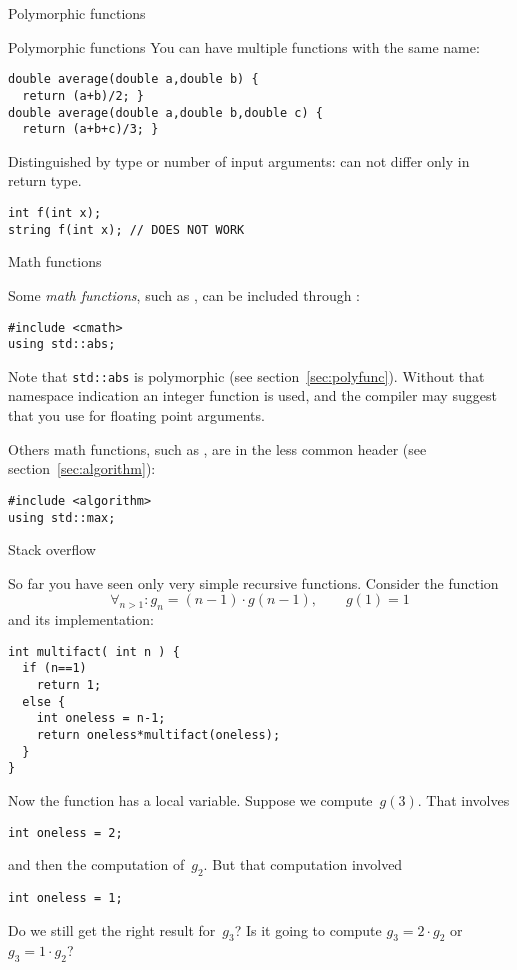  {Polymorphic functions}
\label{sec:polyfunc}

\begin{block}{Polymorphic functions}
  \label{sl:func-poly}
  You can have multiple functions with the same name:
\begin{lstlisting}
double average(double a,double b) {
  return (a+b)/2; }
double average(double a,double b,double c) {
  return (a+b+c)/3; }
\end{lstlisting}
Distinguished by type or number of input arguments:
can not differ only in return type.
\begin{lstlisting}
int f(int x);
string f(int x); // DOES NOT WORK
\end{lstlisting}
\end{block}

 {Math functions}
\label{sec:cmath}

Some \emph{math functions},
such as ,
can be included through :
\begin{lstlisting}
#include <cmath>
using std::abs;
\end{lstlisting}
Note that \lstinline+std::abs+ is polymorphic
(see section~\ref{sec:polyfunc}).
Without that namespace indication
an integer function  is used,
and the compiler may suggest that you use 
for floating point arguments.

Others math functions, such as ,
are in the less common  header
(see section~\ref{sec:algorithm}):
\begin{lstlisting}
#include <algorithm>
using std::max;
\end{lstlisting}


 {Stack overflow}

So far you have seen only very simple recursive functions. Consider
the function
\[ \forall_{n>1}\colon g_n = (n-1)\cdot g(n-1),\qquad g(1)=1 \]
and its implementation:
\begin{lstlisting}
int multifact( int n ) {
  if (n==1)
    return 1;
  else {
    int oneless = n-1;
    return oneless*multifact(oneless);
  }
}
\end{lstlisting}
Now the function has a local variable. Suppose we compute~$g(3)$. That
involves
\begin{lstlisting}
int oneless = 2;
\end{lstlisting}
and then the computation of~$g_2$. But that computation involved 
\begin{lstlisting}
int oneless = 1;
\end{lstlisting}
Do we still get the right result for~$g_3$? Is it going to compute
$g_3=2\cdot g_2$ or $g_3=1\cdot g_2$?

